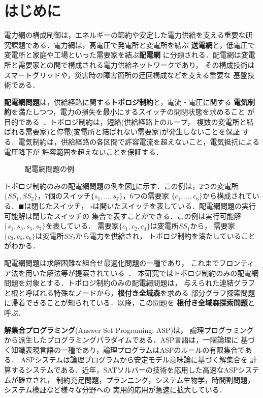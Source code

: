 \section{はじめに}\label{chap:intro}

電力網の構成制御は，エネルギーの節約や安定した電力供給を支える重要な研
究課題である\cite{25627,103687}．電力網は，高電圧で発電所と変電所を結ぶ
\textbf{送電網}と，低電圧で変電所と家庭や工場といった需要家を結ぶ\textbf{配電網}
に分類される．配電網は変電所と需要家との間で構成される電力供給ネットワークであり，
その構成技術はスマートグリッドや，災害時の障害箇所の迂回構成などを支える重要な
基盤技術である．

\textbf{配電網問題}は，供給経路に関する\textbf{トポロジ制約}と，電流・電圧に関する
\textbf{電気制約}を満たしつつ，電力の損失を最小にするスイッチの開閉状態を求めること
が目的である~\cite{Hayashi:dnet:model}．トポロジ制約は，短絡(供給経路上のループ，
複数の変電所と結ばれる需要家)と停電(変電所と結ばれない需要家)が発生しないことを保証
する．電気制約は，供給経路の各区間で許容電流を超えないこと，電気抵抗による電圧降下が
許容範囲を超えないことを保証する．

\begin{figure}[tbp]
 \centering
 \scalebox{0.8}{}
 \caption{配電網問題の例}
 \label{fig:dnetgraph}
\end{figure}

トポロジ制約のみの配電網問題の例を図\ref{fig:dnetgraph}に示す．この例は，2つの変電所
$\{SS_{1}, SS_{2}\}$，7個のスイッチ$\{s_{1},\ldots, s_{7}\}$，6つの需要家
$\{c_{1},\ldots, c_{6}\}$から構成されている．$\blacksquare$は閉じたスイッチ，
$\square$は開いたスイッチを表している．配電網問題の実行可能解は閉じたスイッチの
集合で表すことができる．この例は実行可能解$\{s_{1},s_{3},s_{5},s_{7}\}$を表している．
需要家$\{c_{1},c_{2},c_{4}\}$は変電所$SS_{1}$から，
需要家$\{c_{3},c_{5},c_{6}\}$は変電所$SS_{2}$から電力を供給され，
トポロジ制約を満たしていることがわかる．

配電網問題は求解困難な組合せ最適化問題の一種であり，
これまでフロンティア法を用いた解法等が提案されている~\cite{Minato:dnet:ZDD}．
本研究ではトポロジ制約のみの配電網問題を対象とする．トポロジ制約のみの配電網問題は，
与えられた連結グラフと根と呼ばれる特殊なノードから，\textbf{根付き全域森}を求める
部分グラフ探索問題に帰着できることが知られている．以降，この問題を
\textbf{根付き全域森探索問題}と呼ぶ．

\textbf{解集合プログラミング}(Answer Set Programing; ASP\cite{%
  Baral03:cambridge,%
  Gelfond88:iclp,%
  Niemela99:amai,%
  Inoue08:jssst})は，
論理プログラミングから派生したプログラミングパラダイムである．ASP言語は，一階論理に
基づく知識表現言語の一種であり，論理プログラムはASPのルールの有限集合である．
ASPシステムは論理プログラムから安定モデル意味論\cite{Gelfond88:iclp}に基づく解集合を
計算するシステムである．近年，SATソルバーの技術を応用した高速なASPシステムが確立され，
制約充足問題，プランニング，システム生物学，時間割問題，システム検証など様々な分野への
実用的応用が急速に拡大している\cite{ASPAISAT}．

